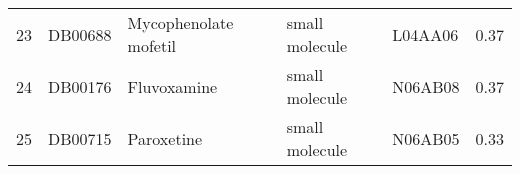 \documentclass[preprint,11pt]{elsarticle}
\begin{document}
\begin{table}[h]
\begin{tabular}{rllllr}
  23 & DB00688 & Mycophenolate mofetil & small molecule & L04AA06 & 0.37 \\ 
  24 & DB00176 & Fluvoxamine & small molecule & N06AB08 & 0.37 \\ 
  25 & DB00715 & Paroxetine & small molecule & N06AB05 & 0.33 \\ 

\end{tabular}
\end{table}
\end{document}
